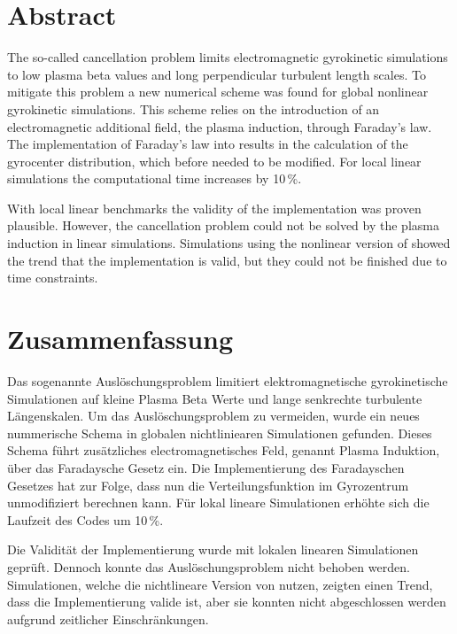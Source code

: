 \chapter*{Abstract}
\label{chap:abstractENG}

The so-called cancellation problem limits electromagnetic gyrokinetic simulations to low plasma beta values and long perpendicular turbulent length scales. To mitigate this problem a new numerical scheme was found for global nonlinear gyrokinetic simulations. This scheme relies on the introduction of an electromagnetic additional field, the plasma induction, through Faraday's law. The implementation of Faraday's law into {\gkw} results in the calculation of the gyrocenter distribution, which before needed to be modified. For local linear simulations the computational time increases by 10\,\%. \bigskip

With local linear benchmarks the validity of the implementation was proven plausible. However, the cancellation problem could not be solved by the plasma induction in linear simulations. Simulations using the nonlinear version of {\gkw} showed the trend that the implementation is valid, but they could not be finished due to time constraints.

\chapter*{Zusammenfassung}
\label{chap:abstractDE}

Das sogenannte Auslöschungsproblem limitiert elektromagnetische gyrokinetische Simulationen auf kleine Plasma Beta Werte und lange senkrechte turbulente Längenskalen. Um das Auslöschungsproblem zu vermeiden, wurde ein neues nummerische Schema in globalen nichtliniearen Simulationen gefunden. Dieses Schema führt zusätzliches electromagnetisches Feld, genannt Plasma Induktion, über das Faradaysche Gesetz ein. Die Implementierung des Faradayschen Gesetzes hat zur Folge, dass {\gkw} nun die Verteilungsfunktion im Gyrozentrum unmodifiziert berechnen kann. Für lokal lineare Simulationen erhöhte sich die Laufzeit des Codes um 10\,\%.\bigskip

Die Validität der Implementierung wurde mit lokalen linearen Simulationen geprüft. Dennoch konnte das Auslöschungsproblem nicht behoben werden. Simulationen, welche die nichtlineare Version von {\gkw} nutzen, zeigten einen Trend, dass die Implementierung valide ist, aber sie konnten nicht abgeschlossen werden aufgrund zeitlicher Einschränkungen.